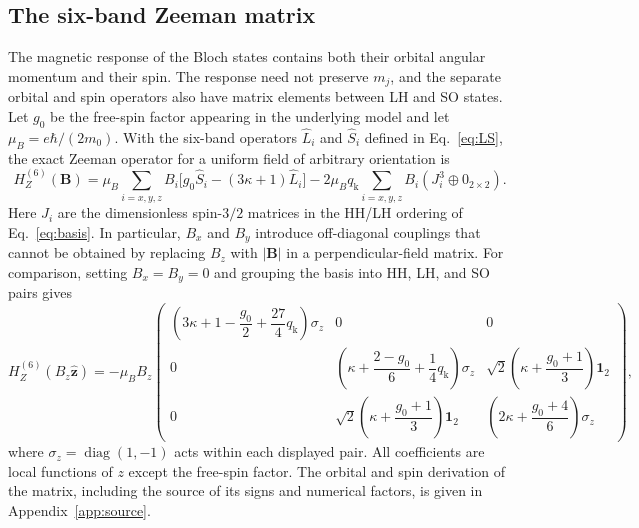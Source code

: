 \documentclass[10pt,letterpaper]{article}
\newcommand{\qq}{q_{\mathrm k}}
\newcommand{\one}{\mathbf 1}
\begin{document}
\subsection{The six-band Zeeman matrix}

The magnetic response of the Bloch states contains both their orbital angular momentum and their spin. The response need not preserve $m_j$, and the separate orbital and spin operators also have matrix elements between LH and SO states. Let $g_0$ be the free-spin factor appearing in the underlying model and let $\mu_B=e\hbar/(2m_0)$. With the six-band operators $\hat L_i$ and $\hat S_i$ defined in Eq.~\eqref{eq:LS}, the exact Zeeman operator for a uniform field of arbitrary orientation is
\begin{equation}
H_Z^{(6)}(\bm B)
=\mu_B\sum_{i=x,y,z}B_i\bigl[g_0\hat S_i-(3\kappa+1)\hat L_i\bigr]
-2\mu_B\qq\sum_{i=x,y,z}B_i(J_i^3\oplus0_{2\times2}).
\label{eq:HZvector}
\end{equation}
Here $J_i$ are the dimensionless spin-$3/2$ matrices in the HH/LH ordering of Eq.~\eqref{eq:basis}. In particular, $B_x$ and $B_y$ introduce off-diagonal couplings that cannot be obtained by replacing $B_z$ with $|\bm B|$ in a perpendicular-field matrix. For comparison, setting $B_x=B_y=0$ and grouping the basis into HH, LH, and SO pairs gives
\begin{equation}
H_Z^{(6)}(B_z\hat{\bm z})=-\mu_BB_z
\begin{pmatrix}
\left(3\kappa+1-\dfrac{g_0}{2}+\dfrac{27}{4}\qq\right)\sigma_z
&0&0\\[6pt]
0&\left(\kappa+\dfrac{2-g_0}{6}+\dfrac14\qq\right)\sigma_z
&\sqrt2\left(\kappa+\dfrac{g_0+1}{3}\right)\one_2\\[6pt]
0&\sqrt2\left(\kappa+\dfrac{g_0+1}{3}\right)\one_2
&\left(2\kappa+\dfrac{g_0+4}{6}\right)\sigma_z
\end{pmatrix},
\label{eq:HZ}
\end{equation}
where $\sigma_z=\operatorname{diag}(1,-1)$ acts within each displayed pair. All coefficients are local functions of $z$ except the free-spin factor. The orbital and spin derivation of the matrix, including the source of its signs and numerical factors, is given in Appendix~\ref{app:source}.
\end{document}
